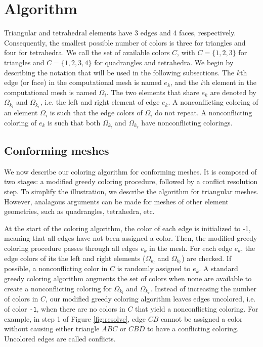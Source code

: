\documentclass[12pt]{article}
\begin{document}
\section{Algorithm} \label{sec:algorithm}
Triangular and tetrahedral elements have 3 edges and 4 faces, respectively.  Consequently, the smallest possible number of colors is three for triangles and four for tetrahedra.  We call the set of available colors $C$, with $C = \{1,2,3\}$ for triangles and $C = \{1,2,3,4\}$ for quadrangles and tetrahedra.  We begin by describing the notation that will be used in the following subsections.  The $k$th edge (or face) in the computational mesh is named $e_k$, and the $i$th element in the computational mesh is named $\Omega_i$.  The two elements that share $e_k$ are denoted by $\Omega_{k_l}$ and $\Omega_{k_r}$, i.e. the left and right element of edge $e_k$.  A nonconflicting coloring of an element $\Omega_i$ is such that the edge colors of $\Omega_i$ do not repeat. A nonconflicting coloring of $e_k$ is such that both $\Omega_{k_l}$ and $\Omega_{k_r}$ have nonconflicting colorings.


\subsection{Conforming meshes}

We now describe our coloring algorithm for conforming meshes.  It is composed of two stages: a modified greedy coloring procedure, followed by a conflict resolution step.  To simplify the illustration, we describe the algorithm for triangular meshes.  However, analagous arguments can be made for meshes of other element geometries, such as quadrangles, tetrahedra, etc.

At the start of the coloring algorithm, the color of each edge is initialized to -1, meaning that all edges have not been assigned a color.  Then, the modified greedy coloring procedure passes through all edges $e_k$ in the mesh.  For each edge $e_k$, the edge colors of its the left and right elements ($\Omega_{k_l}$ and $\Omega_{k_r}$) are checked.  
If possible, a nonconflicting color in $C$ is randomly assigned to $e_k$. A standard greedy coloring algorithm augments the set of colors when none are available to create a nonconflicting coloring for $\Omega_{k_l}$ and $\Omega_{k_r}$.  
Instead of increasing the number of colors in $C$, our modified greedy coloring algorithm leaves edges uncolored, i.e. of color \texttt{-1}, when there are no colors in $C$ that yield a nonconflicting coloring.  
For example, in step 1 of Figure \ref{fig:resolve}, edge $CB$ cannot be assigned a color without causing either triangle $ABC$ or $CBD$ to have a conflicting coloring.  
Uncolored edges are called conflicts. 
\end{document}
